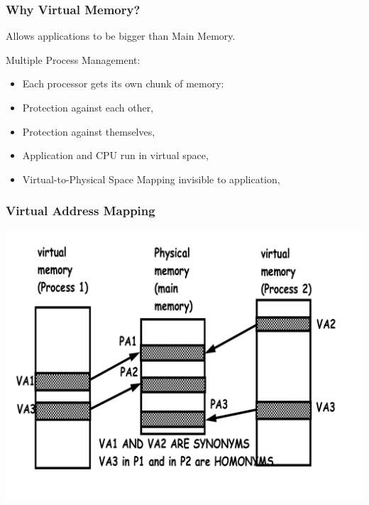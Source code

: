 \documentclass{beamer}
\begin{document}
\begin{frame}[fragile,t]
\frametitle{Why Virtual Memory?}

Allows applications to be bigger than Main Memory.\smallskip

Multiple Process Management:\smallskip
\begin{itemize}
    \item Each processor gets its own chunk of memory:
    \item Protection against each other,
    \item Protection against themselves,
    \item Application and CPU run in virtual space,
    \item Virtual-to-Physical Space Mapping invisible to application,
\end  {itemize}

\end{frame}

\begin{frame}[fragile,t]
\frametitle{Virtual Address Mapping}
\includegraphics[width=55ex]{Figures/FigsMemH/PageSynHom}

\end{frame}
\end{document}
